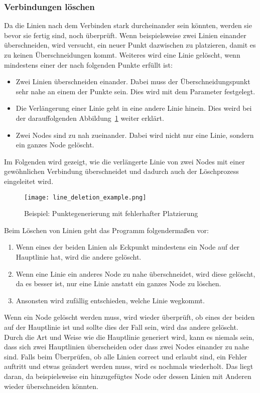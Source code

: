 \subsubsection{Verbindungen löschen}\label{subsubsec:verbindungen-loeschen}
Da die Linien nach dem Verbinden stark durcheinander sein könnten, werden sie bevor sie fertig sind, noch überprüft.
Wenn beispielsweise zwei Linien einander überschneiden, wird versucht, ein neuer Punkt dazwischen zu platzieren, damit es zu keinen Überschneidungen kommt.
Weiteres wird eine Linie gelöscht, wenn mindestens einer der nach folgenden Punkte erfüllt ist:
\begin{itemize}
    \item Zwei Linien überschneiden einander.
    Dabei muss der Überschneidungspunkt sehr nahe an einem der Punkte sein.
    Dies wird mit dem Parameter  festgelegt.
    \item Die Verlängerung einer Linie geht in eine andere Linie hinein.
    Dies weird bei der darauffolgenden Abbildung~\ref{fig:line-deletion} weiter erklärt.
    \item Zwei Nodes sind zu nah zueinander.
    Dabei wird nicht nur eine Linie, sondern ein ganzes Node gelöscht.
\end{itemize}

Im Folgenden wird gezeigt, wie die verlängerte Linie von zwei Nodes mit einer gewöhnlichen Verbindung überschneidet und dadurch auch der Löschprozess eingeleitet wird.
\begin{figure}[H]
    \centering
    \texttt{[image: line\_deletion\_example.png]}
    \caption{Beispiel: Punktegenerierung mit fehlerhafter Platzierung}\label{fig:line-deletion}
\end{figure}

Beim Löschen von Linien geht das Programm folgendermaßen vor:
\begin{enumerate}
    \item Wenn eines der beiden Linien als Eckpunkt mindestens ein Node auf der Hauptlinie hat, wird die andere gelöscht.
    \item Wenn eine Linie ein anderes Node zu nahe überschneidet, wird diese gelöscht, da es besser ist, nur eine Linie anstatt ein ganzes Node zu löschen.
    \item Ansonsten wird zufällig entschieden, welche Linie wegkommt.
\end{enumerate}

Wenn ein Node gelöscht werden muss, wird wieder überprüft, ob eines der beiden auf der Hauptlinie ist und sollte dies der Fall sein, wird das andere gelöscht.
Durch die Art und Weise wie die Hauptlinie generiert wird, kann es niemals sein, dass sich zwei Hauptlinien überscheiden oder dass zwei Nodes einander zu nahe sind.
Falls beim Überprüfen, ob alle Linien correct und erlaubt sind, ein Fehler auftritt und etwas geändert werden muss, wird es nochmals wiederholt.
Das liegt daran, da beispielsweise ein hinzugefügtes Node oder dessen Linien mit Anderen wieder überschneiden könnten.

